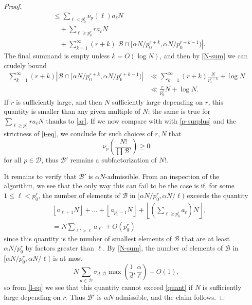 \documentclass[12pt,a4paper,reqno]{amsart}
\numberwithin{equation}{section}
\theoremstyle{plain}
\theoremstyle{definition}
\newcommand\tuple{{\mathcal B}}
\begin{document}
\begin{proof}
\begin{align*}
  &\leq \sum_{\ell < p_0^r} \nu_p(\ell) a_\ell N  \\
  &\quad + \sum_{\ell \geq p_0^r} r a_\ell N  \\
  &\quad + \sum_{k=1}^\infty (r+k)
   |\tuple \cap [\alpha N/p_0^{r+k}, \alpha N/p_0^{r+k-1})|.
\end{align*}
The final summand is empty unless $k = O(\log N)$, and then by \eqref{N-sum} we can crudely bound
\begin{align*}
  \sum_{k=1}^\infty (r+k)
   |\tuple \cap [\alpha N/p_0^{r+k}, \alpha N/p_0^{r+k-1})| &\ll
   \sum_{k=1}^\infty (r+k) \frac{N}{p_0^{r+k}} + \log N\\
   &\ll \frac{r}{p_0^r} N +\log N.
\end{align*}
If $r$ is sufficiently large, and then $N$ sufficiently large depending on $r$, this quantity is smaller than any given multiple of $N$; the same is true for $\sum_{\ell \geq p_0^r} r a_\ell N$ thanks to \eqref{ar}.  If we now compare with with \eqref{p-surplus} and the strictness of \eqref{i-eq}, we conclude for such choices of $r,N$ that
$$ \nu_p\left( \frac{N!}{\prod \tuple'} \right) \geq 0$$
for all $p \in {\mathcal D}$, thus $\tuple'$ remains a subfactorization of $N!$.

It remains to verify that $\tuple'$ is $\alpha N$-admissible.  From an inspection of the algorithm, we see that the only way this can fail to be the case is if, for some $1 \leq \ell < p_0^r$, the number of elements of $\tuple$ in $[\alpha N/p_0^r, \alpha N/\ell)$ exceeds the quantity
\begin{equation}\label{quant} 
  \begin{split}
  &  \left\lfloor a_{\ell+1} N \right\rfloor + \dots + \left\lfloor a_{p_0^r-1} N \right\rfloor
  + \left\lfloor \left(\sum_{\ell \geq p_0^r} a_\ell\right) N \right\rfloor, \\
&= N \sum_{\ell' > \ell} a_{\ell'} + O(p_0^r) 
  \end{split}
\end{equation}  
since this quantity is the number of smallest elements of $\tuple$ that are at least $\alpha N/p_0^r$ by factors greater than $\ell$.  By \eqref{N-sum}, the number of elements of $\tuple$ in $[\alpha N/p_0^r, \alpha N/\ell)$ is at most
$$ N\sum_{d \in {\mathcal D}} \sigma_{d,{\mathcal D}}  \max\left( \frac{1}{d}, \frac{\alpha}{\ell} \right) + O(1),$$
so from \eqref{l-eq} we see that this quantity cannot exceed \eqref{quant} if $N$ is sufficiently large depending on $r$.
Thus $\tuple'$ is $\alpha N$-admissible, and the claim follows.
\end{proof}
\end{document}
